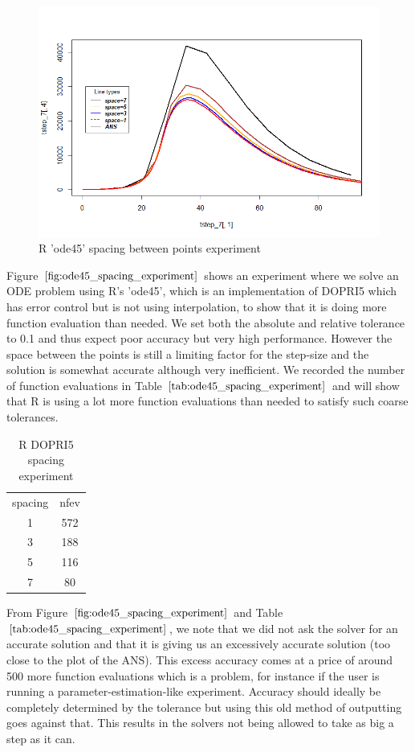 \begin{figure}[h]
	\centering
	\includegraphics[width=0.7\linewidth]{./figures/R_ode45_spacing_experiment}
	\caption{R 'ode45' spacing between points experiment}
	\label{fig:ode45_spacing_experiment}
\end{figure}

Figure $\ref{fig:ode45_spacing_experiment}$ shows an experiment where we solve an ODE problem using R's 'ode45', which is an implementation of DOPRI5 which has error control but is not using interpolation, to show that it is doing more function evaluation than needed. We set both the absolute and relative tolerance to 0.1 and thus expect poor accuracy but very high performance. However the space between the points is still a limiting factor for the step-size and the solution is somewhat accurate although very inefficient. We recorded the number of function evaluations in Table $\ref{tab:ode45_spacing_experiment}$ and will show that R is using a lot more function evaluations than needed to satisfy such coarse tolerances.

\begin{table}[h]
\caption {R DOPRI5 spacing experiment} \label{tab:ode45_spacing_experiment} 
\begin{center}
\begin{tabular}{ c c }
spacing & nfev \\ 
1 & 572 \\
3 & 188 \\
5 & 116 \\
7 & 80  \\
\end{tabular}
\end{center}
\end{table}

From Figure $\ref{fig:ode45_spacing_experiment}$ and Table $\ref{tab:ode45_spacing_experiment}$, we note that we did not ask the solver for an accurate solution and that it is giving us an excessively accurate solution (too close to the plot of the ANS). This excess accuracy comes at a price of around 500 more function evaluations which is a problem, for instance if the user is running a parameter-estimation-like experiment. Accuracy should ideally be completely determined by the tolerance but using this old method of outputting goes against that. This results in the solvers not being allowed to take as big a step as it can. 

